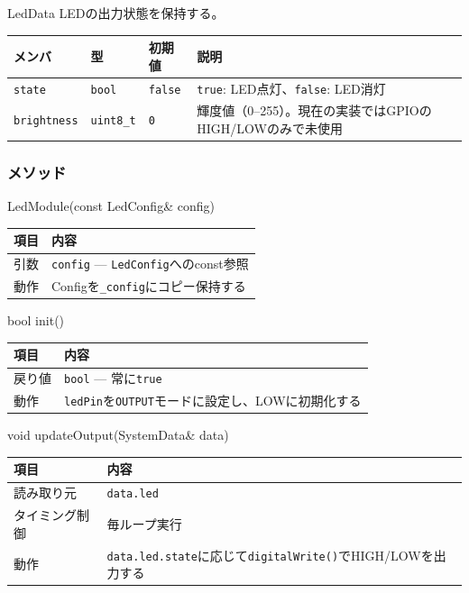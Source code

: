 \begin{funcblock}{LedData}
LEDの出力状態を保持する。

\begin{longtable}{l l l p{5.5cm}}
\toprule
\textbf{メンバ} & \textbf{型} & \textbf{初期値} & \textbf{説明} \\
\midrule
\endhead
\texttt{state}      & \texttt{bool}     & \texttt{false} & \texttt{true}: LED点灯、\texttt{false}: LED消灯 \\
\texttt{brightness} & \texttt{uint8\_t} & \texttt{0}     & 輝度値（0--255）。現在の実装ではGPIOのHIGH/LOWのみで未使用 \\
\bottomrule
\end{longtable}
\end{funcblock}

\subsubsection{メソッド}

\begin{funcblock}{LedModule(const LedConfig\& config)}
\begin{tabularx}{\textwidth}{l X}
\toprule
\textbf{項目} & \textbf{内容} \\
\midrule
引数   & \texttt{config} --- \texttt{LedConfig}へのconst参照 \\
動作   & Configを\texttt{\_config}にコピー保持する \\
\bottomrule
\end{tabularx}
\end{funcblock}

\begin{funcblock}{bool init()}
\begin{tabularx}{\textwidth}{l X}
\toprule
\textbf{項目} & \textbf{内容} \\
\midrule
戻り値   & \texttt{bool} --- 常に\texttt{true} \\
動作     & \texttt{ledPin}を\texttt{OUTPUT}モードに設定し、LOWに初期化する \\
\bottomrule
\end{tabularx}
\end{funcblock}

\begin{funcblock}{void updateOutput(SystemData\& data)}
\begin{tabularx}{\textwidth}{l X}
\toprule
\textbf{項目} & \textbf{内容} \\
\midrule
読み取り元     & \texttt{data.led} \\
タイミング制御 & 毎ループ実行 \\
動作           & \texttt{data.led.state}に応じて\texttt{digitalWrite()}でHIGH/LOWを出力する \\
\bottomrule
\end{tabularx}
\end{funcblock}


